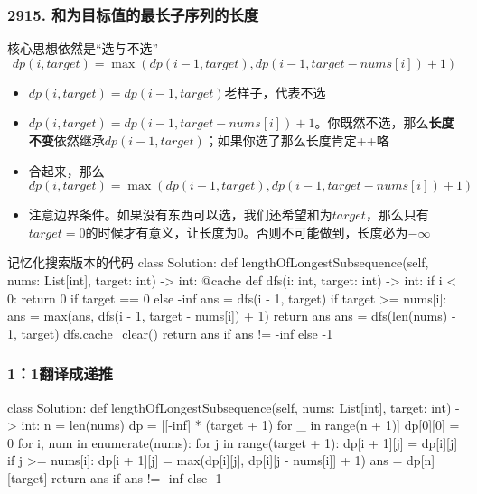 \begin{frame}[fragile]          %
  \frametitle{\textsc{2915. 和为目标值的最长子序列的长度}}
  \begin{alertblock}{核心思想依然是“选与不选”}
    \begin{equation*}
      dp(i,target)=\max(dp(i-1,target),dp(i-1,target-nums[i])+1)
    \end{equation*}
  \end{alertblock}
  \begin{itemize}
    \item $dp(i,target)=dp(i-1,target)$老样子，代表不选
    \item $dp(i,target)=dp(i-1,target - nums[i]) + 1$。你既然不选，那么\textbf{长度不变}依然继承$dp(i-1,target)$；如果你选了那么长度肯定++咯
    \item 合起来，那么$dp(i,target)=\max(dp(i-1,target),dp(i-1,target-nums[i])+1)$
    \item 注意边界条件。如果没有东西可以选，我们还希望和为$target$，那么只有$target=0$的时候才有意义，让长度为0。否则不可能做到，长度必为$-\infty$
  \end{itemize}
\end{frame}



\begin{frame}[fragile]          %
  
  \begin{codeblock}[language=python]{记忆化搜索版本的代码}
class Solution:
    def lengthOfLongestSubsequence(self, nums: List[int], target: int) -> int:
        @cache
        def dfs(i: int, target: int) -> int:
            if i < 0:
                return 0 if target == 0 else -inf
            ans = dfs(i - 1, target)
            if target >= nums[i]:
                ans = max(ans, dfs(i - 1, target - nums[i]) + 1)
            return ans
        ans = dfs(len(nums) - 1, target)
        dfs.cache_clear()
        return ans if ans != -inf else -1
  \end{codeblock}
\end{frame}


\begin{frame}[fragile]          %
  \frametitle{1：1翻译成递推}
  \begin{codeblock}[language=python]{}
class Solution:
    def lengthOfLongestSubsequence(self, nums: List[int], target: int) -> int:
        n = len(nums)
        dp = [[-inf] * (target + 1) for _ in range(n + 1)]
        dp[0][0] = 0
        for i, num in enumerate(nums):
            for j in range(target + 1):
                dp[i + 1][j] = dp[i][j]
                if j >= nums[i]:
                    dp[i + 1][j] = max(dp[i][j], dp[i][j - nums[i]] + 1)
        ans = dp[n][target]
        return ans if ans != -inf else -1
  \end{codeblock}
\end{frame}



